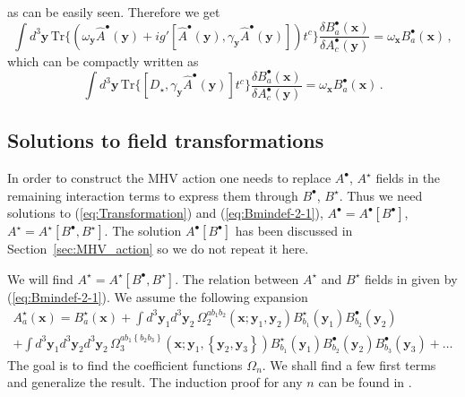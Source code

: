 \documentclass[english,american]{article}
\begin{document}
as can be easily seen. Therefore we get
\begin{equation}
\int d^{3}\mathbf{y}\,\mathrm{Tr}\Bigg\{\left(\omega_{\mathbf{y}}\hat{A}^{\bullet}\left(\mathbf{y}\right)+ig'\left[\hat{A}^{\bullet}\left(\mathbf{y}\right),\gamma_{\mathbf{y}}\hat{A}^{\bullet}\left(\mathbf{y}\right)\right]\right)t^{c}\Bigg\}\frac{\delta B_{a}^{\bullet}\left(\mathbf{x}\right)}{\delta A_{c}^{\bullet}\left(\mathbf{y}\right)}=\omega_{\mathbf{x}}B_{a}^{\bullet}\left(\mathbf{x}\right)\,,\label{eq:Transformation0}
\end{equation}
which can be compactly written as
\begin{equation}
\int d^{3}\mathbf{y}\,\mathrm{Tr}\Bigg\{\left[D_{\star},\gamma_{\mathbf{y}}\hat{A}^{\bullet}\left(\mathbf{y}\right)\right]t^{c}\Bigg\}\frac{\delta B_{a}^{\bullet}\left(\mathbf{x}\right)}{\delta A_{c}^{\bullet}\left(\mathbf{y}\right)}=\omega_{\mathbf{x}}B_{a}^{\bullet}\left(\mathbf{x}\right)\,.\label{eq:Transformation}
\end{equation}



\subsection{Solutions to field transformations}

In order to construct the MHV action one needs to replace $A^{\bullet}$,
$A^{\star}$ fields in the remaining interaction terms to express
them through $B^{\bullet}$, $B^{\star}$. Thus we need solutions
to (\ref{eq:Transformation}) and (\ref{eq:Bmindef-2-1}), $A^{\bullet}=A^{\bullet}\left[B^{\bullet}\right]$,
$A^{\star}=A^{\star}\left[B^{\bullet},B^{\star}\right]$. The solution
$A^{\bullet}\left[B^{\bullet}\right]$ has been  discussed in Section~\ref{sec:MHV_action}
so we do not repeat it here.

We will find $A^{\star}=A^{\star}\left[B^{\bullet},B^{\star}\right]$.
The relation between $A^{\star}$ and $B^{\star}$ fields in given
by (\ref{eq:Bmindef-2-1}). We assume the following expansion 
\begin{multline}
A_{a}^{\star}\left(\mathbf{x}\right)=B_{a}^{\star}\left(\mathbf{x}\right)+\int d^{3}\mathbf{y}_{1}d^{3}\mathbf{y}_{2}\,\Omega_{2}^{ab_{1}b_{2}}\left(\mathbf{x};\mathbf{y}_{1},\mathbf{y}_{2}\right)B_{b_{1}}^{\star}\left(\mathbf{y}_{1}\right)B_{b_{2}}^{\bullet}\left(\mathbf{y}_{2}\right)\\
+\int d^{3}\mathbf{y}_{1}d^{3}\mathbf{y}_{2}d^{3}\mathbf{y}_{2}\,\Omega_{3}^{ab_{1}\left\{ b_{2}b_{3}\right\} }\left(\mathbf{x};\mathbf{y}_{1},\left\{ \mathbf{y}_{2},\mathbf{y}_{3}\right\} \right)B_{b_{1}}^{\star}\left(\mathbf{y}_{1}\right)B_{b_{2}}^{\bullet}\left(\mathbf{y}_{2}\right)B_{b_{3}}^{\bullet}\left(\mathbf{y}_{3}\right)+\dots
\end{multline}
The goal is to find the coefficient functions $\Omega_{n}$. We shall
find a few first terms and generalize the result. The induction proof
for any $n$ can be found in \citep{Ettle2006b}.
\end{document}
